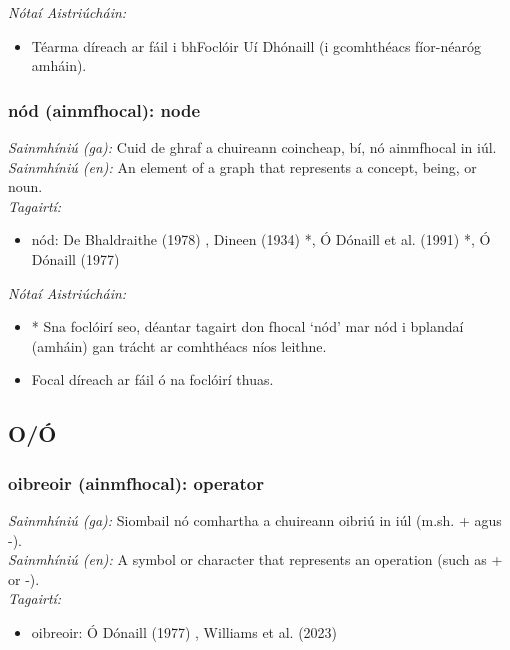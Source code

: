 \documentclass{article}
\begin{document}
 \noindent \textit{Nótaí Aistriúcháin:}
\begin{itemize}
	\item Téarma díreach ar fáil i bhFoclóir Uí Dhónaill (i gcomhthéacs fíor-néaróg amháin).
\end{itemize}


\subsubsection*{nód (ainmfhocal): node}
 \noindent \textit{Sainmhíniú (ga):} Cuid de ghraf a chuireann coincheap, bí, nó ainmfhocal in iúl.
\\
 \noindent \textit{Sainmhíniú (en):} An element of a graph that represents a concept, being, or noun.
\\
 \noindent \textit{Tagairtí:}
\begin{itemize}
	\item nód: De Bhaldraithe (1978) \cite{de-bhaldraithe}, Dineen (1934) \cite{dineen}*, Ó Dónaill et al. (1991) \cite{focloir-beag}*, Ó Dónaill (1977) \cite{odonaill}
\end{itemize}

 \noindent \textit{Nótaí Aistriúcháin:}
\begin{itemize}
	\item * Sna foclóirí seo, déantar tagairt don fhocal `nód' mar nód i bplandaí (amháin) gan trácht ar comhthéacs níos leithne.
	\item Focal díreach ar fáil ó na foclóirí thuas.
\end{itemize}


\subsection*{O/Ó}

\subsubsection*{oibreoir (ainmfhocal): operator}
 \noindent \textit{Sainmhíniú (ga):} Siombail nó comhartha a chuireann oibriú in iúl (m.sh. + agus -).
\\
 \noindent \textit{Sainmhíniú (en):} A symbol or character that represents an operation (such as + or -).
\\
 \noindent \textit{Tagairtí:}
\begin{itemize}
	\item oibreoir: Ó Dónaill (1977) \cite{odonaill}, Williams et al. (2023) \cite{storchiste}
\end{itemize}
\end{document}
